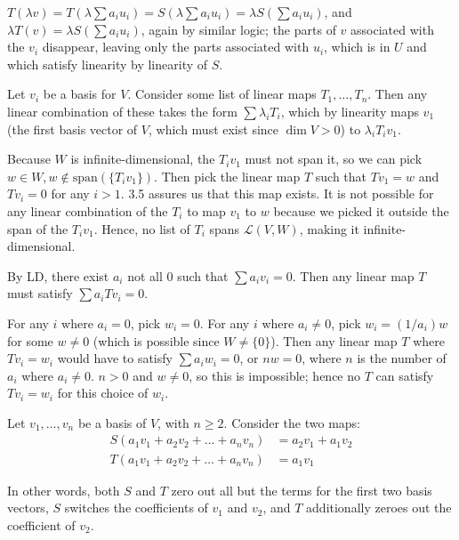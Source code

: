 \documentclass{article}
\begin{document}
$T(\lambda v) = T(\lambda \sum a_iu_i) = S(\lambda \sum a_iu_i) = \lambda S(\sum
a_iu_i)$, and $\lambda T(v) = \lambda S(\sum a_iu_i)$, again by similar logic;
the parts of $v$ associated with the $v_i$ disappear, leaving only the parts
associated with $u_i$, which is in $U$ and which satisfy linearity by linearity
of $S$.


Let $v_i$ be a basis for $V$. Consider some list of linear maps $T_1, \ldots,
T_n$. Then any linear combination of these takes the form $\sum \lambda_i T_i$,
which by linearity maps $v_1$ (the first basis vector of $V$, which must exist
since $\dim V > 0$) to $\lambda_i T_iv_1$.

Because $W$ is infinite-dimensional, the $T_iv_1$ must not span it, so we can
pick $w \in W, w \notin \text{span}(\{T_iv_1\})$. Then pick the linear map $T$
such that $Tv_1 = w$ and $Tv_i = 0$ for any $i > 1$. 3.5 assures us that this
map exists. It is not possible for any linear combination of the $T_i$ to map
$v_1$ to $w$ because we picked it outside the span of the $T_iv_1$. Hence, no
list of $T_i$ spans $\mathcal{L}(V,W)$, making it infinite-dimensional.


By LD, there exist $a_i$ not all 0 such that $\sum a_iv_i = 0$. Then any linear
map $T$ must satisfy $\sum a_iTv_i = 0$.

For any $i$ where $a_i = 0$, pick $w_i = 0$. For any $i$ where $a_i \neq 0$,
pick $w_i = (1/a_i)w$ for some $w \neq 0$ (which is possible since $W \neq
\{0\}$). Then any linear map $T$ where $Tv_i = w_i$ would have to satisfy $\sum
a_iw_i = 0$, or $nw = 0$, where $n$ is the number of $a_i$ where $a_i \neq 0$.
$n > 0$ and $w \neq 0$, so this is impossible; hence no $T$ can satisfy $Tv_i =
w_i$ for this choice of $w_i$.


Let $v_1, \ldots, v_n$ be a basis of $V$, with $n \geq 2$. Consider the two
maps:
\begin{align*}
  S(a_1v_1 + a_2v_2 + \ldots + a_nv_n) & = a_2v_1 + a_1v_2 \\
  T(a_1v_1 + a_2v_2 + \ldots + a_nv_n) & = a_1v_1
\end{align*}

In other words, both $S$ and $T$ zero out all but the terms for the first two
basis vectors, $S$ switches the coefficients of $v_1$ and $v_2$, and $T$
additionally zeroes out the coefficient of $v_2$.
\end{document}
